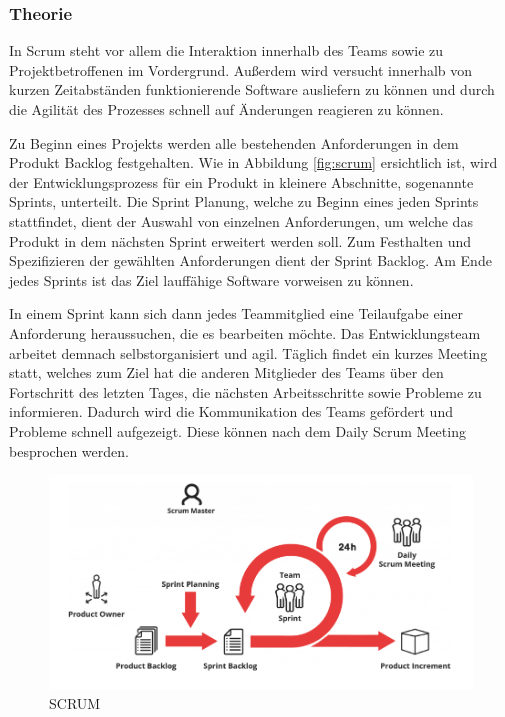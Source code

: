 \subsubsection{Theorie}
In Scrum steht vor allem die Interaktion innerhalb des Teams sowie zu Projektbetroffenen im Vordergrund. Außerdem wird versucht innerhalb von kurzen Zeitabständen funktionierende Software ausliefern zu können und durch die Agilität des Prozesses schnell auf Änderungen reagieren zu können. 

Zu Beginn eines Projekts werden alle bestehenden Anforderungen in dem Produkt Backlog festgehalten. Wie in Abbildung \vref{fig:scrum} ersichtlich ist, wird der Entwicklungsprozess für ein Produkt in kleinere Abschnitte, sogenannte Sprints, unterteilt. Die Sprint Planung, welche zu Beginn eines jeden Sprints stattfindet, dient der Auswahl von einzelnen Anforderungen, um welche das Produkt in dem nächsten Sprint erweitert werden soll. Zum Festhalten und Spezifizieren der gewählten Anforderungen dient der Sprint Backlog. Am Ende jedes Sprints ist das Ziel lauffähige Software vorweisen zu können. 

In einem Sprint kann sich dann jedes Teammitglied eine Teilaufgabe einer Anforderung heraussuchen, die es bearbeiten möchte. Das Entwicklungsteam arbeitet demnach selbstorganisiert und agil. Täglich findet ein kurzes Meeting statt, welches zum Ziel hat die anderen Mitglieder des Teams über den Fortschritt des letzten Tages, die nächsten Arbeitsschritte sowie Probleme zu informieren. Dadurch wird die Kommunikation des Teams gefördert und Probleme schnell aufgezeigt. Diese können nach dem Daily Scrum Meeting besprochen werden. 

\begin{figure}[H]
	\centering 
	\includegraphics[width=14cm]{img/Scrum.png}
	\captionsetup{format=hang}
	\centering\caption[Iteratives Modell]{\label{fig:scrum}SCRUM \footnotemark}
\end{figure}

